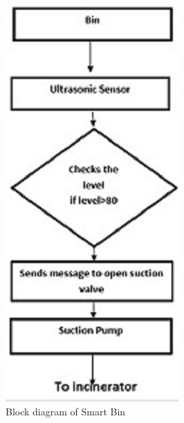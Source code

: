 \begin{figure}
    \centering
    \includegraphics{b2.jpg}
    \caption{Block diagram of Smart Bin}
    \label{Block diagram of Smart Bin}
\end{figure}
